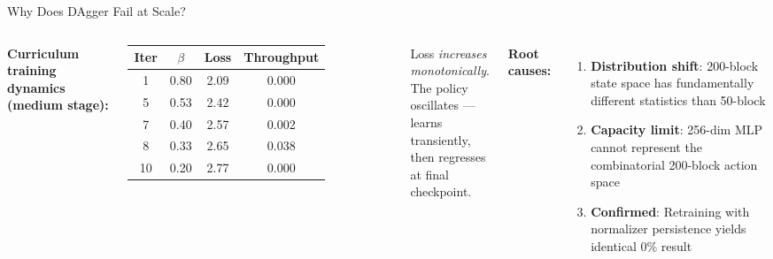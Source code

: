 \documentclass[aspectratio=169,12pt]{beamer}
\begin{document}
\begin{frame}{Why Does DAgger Fail at Scale?}

\begin{columns}[T]
\vspace{0.5em}
\textbf{Curriculum training dynamics (medium stage):}

\vspace{0.3em}
\begin{tabular}{@{}cccc@{}}
\toprule
Iter & $\beta$ & Loss & Throughput \\
\midrule
1 & 0.80 & 2.09 & 0.000 \\
5 & 0.53 & 2.42 & 0.000 \\
7 & 0.40 & 2.57 & {\color{success}0.002} \\
8 & 0.33 & 2.65 & {\color{success}0.038} \\
10 & 0.20 & 2.77 & {\color{danger}0.000} \\
\bottomrule
\end{tabular}

\vspace{0.5em}
{\small Loss \textit{increases monotonically}.\\The policy oscillates --- learns transiently,\\then regresses at final checkpoint.}

\vspace{0.5em}
\textbf{Root causes:}

\vspace{0.5em}
\begin{enumerate}
    \setlength\itemsep{0.5em}
    \item \textbf{Distribution shift}: 200-block state space has fundamentally different statistics than 50-block
    \item \textbf{Capacity limit}: 256-dim MLP cannot represent the combinatorial 200-block action space
    \item \textbf{Confirmed}: Retraining with normalizer persistence yields identical 0\% result
\end{enumerate}
\end{columns}
\end{frame}
\end{document}

